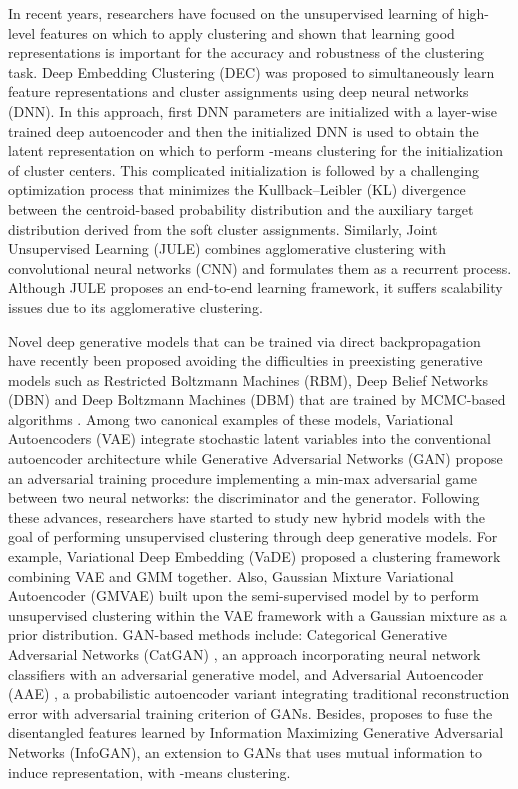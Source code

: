 \documentclass{article} \usepackage{iclr2018_conference,times}
\begin{document}
In recent years, researchers have focused on the unsupervised learning of high-level features on which to apply clustering and shown that learning good representations is important for the accuracy and robustness of the clustering task. Deep Embedding Clustering (DEC) \citep{XieGF16} was proposed to simultaneously learn feature representations and cluster assignments using deep neural networks (DNN). In this approach, first DNN parameters are initialized with a layer-wise trained deep autoencoder \citep{VincentLLBM10} and then the initialized DNN is used to obtain the latent representation on which to perform -means clustering for the initialization of cluster centers. This complicated initialization is followed by a challenging optimization process that minimizes the Kullback–Leibler (KL) divergence between the centroid-based probability distribution and the auxiliary target distribution derived from the soft cluster assignments. Similarly, Joint Unsupervised Learning (JULE) \citep{YangPB16} combines agglomerative clustering with convolutional neural networks (CNN) and formulates them as a recurrent process. Although JULE proposes an end-to-end learning framework, it suffers scalability issues due to its agglomerative clustering. 

Novel deep generative models that can be trained via direct backpropagation have recently been proposed avoiding the difficulties in preexisting generative models such as Restricted Boltzmann Machines (RBM), Deep Belief Networks (DBN) and Deep Boltzmann Machines (DBM) that are trained by MCMC-based algorithms \citep{hinton2006fast, boltzmann}. Among two canonical examples of these models, Variational Autoencoders (VAE) \citep{KingmaW13, RezendeMW14} integrate stochastic latent variables into the conventional autoencoder architecture while Generative Adversarial Networks (GAN) \citep{GoodfellowPMXWOCB14} propose an adversarial training procedure implementing a min-max adversarial game between two neural networks: the discriminator and the generator. Following these advances, researchers have started to study new hybrid models with the goal of performing unsupervised clustering through deep generative models. For example, Variational Deep Embedding (VaDE) \citep{JiangZTTZ17} proposed a clustering framework combining VAE and GMM together. Also, Gaussian Mixture Variational Autoencoder (GMVAE) \citep{DilokthanakulMG16} built upon the semi-supervised model by \citet{KingmaMRW14} to perform unsupervised clustering within the VAE framework with a Gaussian mixture as a prior distribution. GAN-based methods include: Categorical Generative Adversarial Networks (CatGAN) \citep{Springenberg15}, an approach incorporating neural network classifiers with an adversarial generative model, and Adversarial Autoencoder (AAE) \citep{MakhzaniSJG15}, a probabilistic autoencoder variant integrating traditional reconstruction error with adversarial training criterion of GANs. Besides, \citet{premachandran2016} proposes to fuse the disentangled features learned by Information Maximizing Generative Adversarial Networks (InfoGAN), an extension to GANs that uses mutual information to induce representation, with -means clustering.
\end{document}
